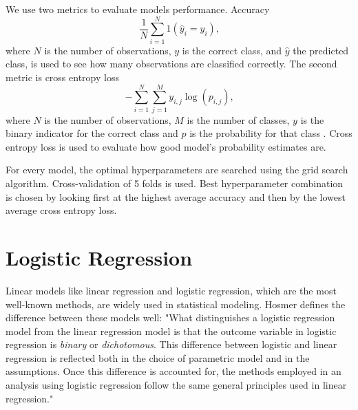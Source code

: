 We use two metrics to evaluate models performance. Accuracy
\begin{equation}
    \frac { 1 } { N} \sum _ { i = 1 } ^ {N} 1 \left( \hat { y } _ { i } = y _ { i } \right)\text{,}
\end{equation}
where $N$ is the number of observations, $y$ is the correct class, and $\hat { y }$ the predicted class, is used to see how many observations are classified correctly. The second metric is cross entropy loss
\begin{equation}
    - \sum _ { i = 1 } ^ { N }\sum _ { j = 1 } ^ { M } y _ { i,j } \log \left( p _ { i,j } \right) \text{,}
\end{equation}
where $N$ is the number of observations, $M$ is the number of classes, $y$ is the binary indicator for the correct class and $p$ is the probability for that class \cite{nasrabadi2007pattern}. Cross entropy loss is used to evaluate how good model's probability estimates are.

For every model, the optimal hyperparameters are searched using the grid search algorithm. Cross-validation of 5 folds is used. Best hyperparameter combination is chosen by looking first at the highest average accuracy and then by the lowest average cross entropy loss.

\section{Logistic Regression}
Linear models like linear regression and logistic regression, which are the most well-known methods, are widely used in statistical modeling. Hosmer\cite{hosmer2013applied} defines the difference between these models well: "What distinguishes a logistic regression model from the linear regression model is that the outcome variable in logistic regression is \textit{binary} or \textit{dichotomous}. This difference between logistic and linear regression is reflected both in the choice of parametric model and in the assumptions. Once this difference is accounted for, the methods employed in an analysis using logistic regression follow the same general principles used in linear regression."

